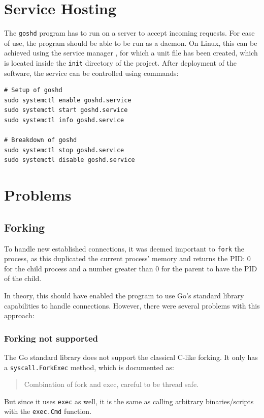 \documentclass[10pt,a4paper,titlepage,twoside,english,final]{zhawreprt}
\begin{document}
\section{Service Hosting}\label{sec:ImplServiceHosting}
The \texttt{goshd} program has to run on a server to accept incoming requests.
For ease of use, the program should be able to be run as a \gls{daemon}.
On \gls{Linux}, this can be achieved using the service manager \cite{systemd}, for which a unit file has been created, which is located inside the \texttt{init} directory of the project.
After deployment of the software, the service can be controlled using \cite{systemd} commands:
\setlistingBash
\begin{lstlisting}[caption={\texttt{goshd} service control},label=lst:GoshdServiceCtl,deletekeywords={enable}]
# Setup of goshd
sudo systemctl enable goshd.service
sudo systemctl start goshd.service
sudo systemctl info goshd.service

# Breakdown of goshd
sudo systemctl stop goshd.service
sudo systemctl disable goshd.service
\end{lstlisting}


\section{Problems}\label{sec:Problems}
\subsection{Forking}\label{ssec:Forking}
To handle new established connections, it was deemed important to \texttt{fork} the process, as this duplicated the current process' memory and returns the \gls{PID}: 0 for the child process and a number greater than 0 for the parent to have the \gls{PID} of the child.

In theory, this should have enabled the program to use \gls{Go}'s standard library capabilities to handle connections.
However, there were several problems with this approach:

\subsubsection{Forking not supported}\label{sssec:ForkingNotSupported}
The \gls{Go} standard library does not support the classical \gls{C}-like forking.
It only has a \texttt{syscall.\linebreak{}ForkExec} method, which is documented as:
\begin{quote}
Combination of fork and exec, careful to be thread safe.
\end{quote}
But since it uses \texttt{exec} as well, it is the same as calling arbitrary binaries/scripts with the \texttt{exec.Cmd} function.
\end{document}
